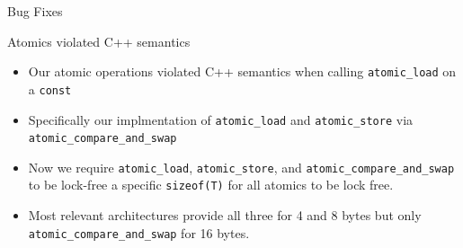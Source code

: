 
\begin{frame}[fragile]

  {\Huge Bug Fixes}

  \vspace{10pt}

\end{frame}


\begin{frame}[fragile]{Atomics violated C++ semantics}

\begin{itemize}
  \item Our atomic operations violated C++ semantics when calling \texttt{atomic\_load} on a \texttt{const}
  \item Specifically our implmentation of \texttt{atomic\_load} and \texttt{atomic\_store} via \texttt{atomic\_compare\_and\_swap}
  \item Now we require \texttt{atomic\_load}, \texttt{atomic\_store}, and \texttt{atomic\_compare\_and\_swap} to be lock-free a specific \texttt{sizeof(T)} for all atomics to be lock free.
  \item Most relevant architectures provide all three for 4 and 8 bytes but only \texttt{atomic\_compare\_and\_swap} for 16 bytes.
\end{itemize}

\end{frame}


